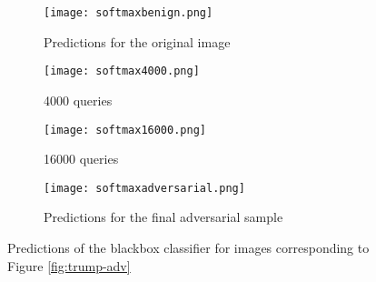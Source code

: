 \begin{figure}
\begin{subfigure}{.5\textwidth}
  \centering%
  \texttt{[image: softmaxbenign.png]}
  \caption{Predictions for the original image}
\end{subfigure}
\begin{subfigure}{.5\textwidth}
  \centering
  \texttt{[image: softmax4000.png]}
  \caption{4000 queries}
\end{subfigure}


\begin{subfigure}{.5\textwidth}
  \centering
  \texttt{[image: softmax16000.png]}
  \caption{16000 queries}
\end{subfigure}
\begin{subfigure}{.5\textwidth}
  \centering
  \texttt{[image: softmaxadversarial.png]}
  \caption{Predictions for the final adversarial sample}
\end{subfigure}

\caption{Predictions of the blackbox classifier for images corresponding to Figure \ref{fig:trump-adv}}
\label{fig:trump-softmax}
\end{figure}